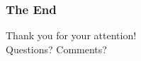 \begin{frame}
    \frametitle{The End}

    \centering
    \Large{Thank you for your attention!}\\
    \vspace{16pt}
    \normalsize{Questions? Comments?}
\end{frame}